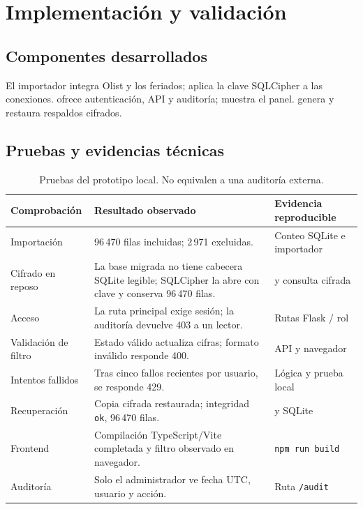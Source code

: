 \documentclass[12pt,a4paper]{article}
\begin{document}
\section{Implementación y validación}
\subsection{Componentes desarrollados}
El importador  integra Olist y los feriados;  aplica la clave SQLCipher a las conexiones.  ofrece autenticación, API y auditoría;  muestra el panel.  genera y restaura respaldos cifrados.

\subsection{Pruebas y evidencias técnicas}
\begin{table}[H]
\centering\footnotesize
\begin{tabularx}{\textwidth}{P{3.7cm}Y P{2.7cm}}
\toprule
Comprobación & Resultado observado & Evidencia reproducible\\
\midrule
Importación & 96\,470 filas incluidas; 2\,971 excluidas. & Conteo SQLite e importador\\
Cifrado en reposo & La base migrada no tiene cabecera SQLite legible; SQLCipher la abre con clave y conserva 96\,470 filas. &  y consulta cifrada\\
Acceso & La ruta principal exige sesión; la auditoría devuelve 403 a un lector. & Rutas Flask / rol\\
Validación de filtro & Estado válido actualiza cifras; formato inválido responde 400. & API y navegador\\
Intentos fallidos & Tras cinco fallos recientes por usuario, se responde 429. & Lógica y prueba local\\
Recuperación & Copia cifrada restaurada; integridad \texttt{ok}, 96\,470 filas. &  y SQLite\\
Frontend & Compilación TypeScript/Vite completada y filtro observado en navegador. & \texttt{npm run build}\\
Auditoría & Solo el administrador ve fecha UTC, usuario y acción. & Ruta \texttt{/audit}\\
\bottomrule
\end{tabularx}
\caption{Pruebas del prototipo local. No equivalen a una auditoría externa.}
\end{table}
\end{document}
